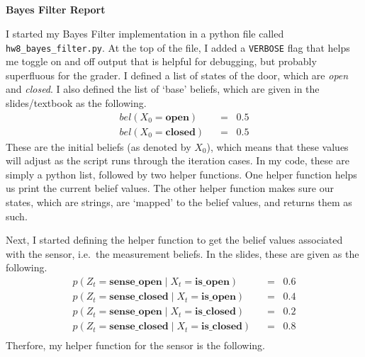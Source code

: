 \documentclass[12pt]{article}
\title{
    \vspace{2in}
    \textmd{\textbf{\hmwkClass\ \hmwkTitle}}\\
    \vspace{3in}
}
\author{\hmwkAuthorName}
\date{}
\begin{document}
\maketitle

\pagebreak

\begin{center}
    \large\textbf{Bayes Filter Report}
\end{center}
I started my Bayes Filter implementation in a python file called
\lstinline{hw8_bayes_filter.py}. At the top of the file, I added a \lstinline{VERBOSE}
flag that helps me toggle on and off output that is helpful for debugging, but
probably superfluous for the grader. I defined a list of states of the door,
which are \textit{open} and \textit{closed}. I also defined the list of 
`base' beliefs, which
are given in the slides/textbook as the following.
\begin{align*}
    bel(X_0 = \mathbf{open})\;\; &=\;\; 0.5\\
    bel(X_0 = \mathbf{closed})\;\; &=\;\; 0.5
\end{align*}
These are the initial beliefs (as denoted by $X_0$), which means that these values
will adjust as the script runs through the iteration cases. In my code, these are
simply a python list, followed by two helper functions. One helper function helps
us print the current belief values.
The other helper function makes sure our states, which are strings, are `mapped'
to the belief values, and returns them as such.

\vspace{0.15in}
Next, I started defining the helper function to get the belief values associated
with the sensor, i.e.\ the measurement beliefs. In the slides, these are given
as the following.
\begin{align*}
    p(Z_t = \mathbf{sense\_open} \;|\; X_t = \mathbf{is\_open})\;\;&=\;\;0.6\\
    p(Z_t = \mathbf{sense\_closed} \;|\; X_t = \mathbf{is\_open})\;\;&=\;\;0.4\\
    p(Z_t = \mathbf{sense\_open} \;|\; X_t = \mathbf{is\_closed})\;\;&=\;\;0.2\\
    p(Z_t = \mathbf{sense\_closed} \;|\; X_t = \mathbf{is\_closed})\;\;&=\;\;0.8\\
\end{align*}
Therfore, my helper function for the sensor is the following.

\vspace{0.15in}
\end{document}

